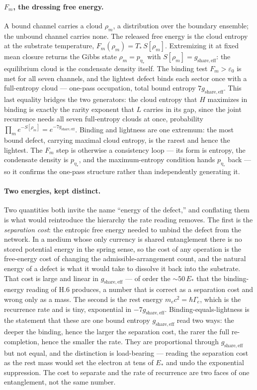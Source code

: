 \documentclass[11pt]{article}
\begin{document}
\paragraph{$F_m$, the dressing free energy.}
A bound channel carries a cloud $\rho_m$, a distribution over the boundary ensemble; the unbound channel carries none. The released free energy is the cloud entropy at the substrate temperature, $F_m(\rho_m)=T_*\,S[\rho_m]$. Extremizing it at fixed mean closure returns the Gibbs state $\rho_m=p_{\eta_*}$ with $S[\rho_m]=g_{\mathrm{share,eff}}$: the equilibrium cloud is the condensate density itself. The binding test $F_m>\varepsilon_0$ is met for all seven channels, and the lightest defect binds each sector once with a full-entropy cloud --- one-pass occupation, total bound entropy $7g_{\mathrm{share,eff}}$. This last equality bridges the two generators: the cloud entropy that $H$ maximizes in binding is exactly the rarity exponent that $L$ carries in its gap, since the joint recurrence needs all seven full-entropy clouds at once, probability $\prod_m e^{-S[\rho_m]}=e^{-7g_{\mathrm{share,eff}}}$. Binding and lightness are one extremum: the most bound defect, carrying maximal cloud entropy, is the rarest and hence the lightest. The $F_m$ step is otherwise a consistency loop --- its form is entropy, the condensate density is $p_{\eta_*}$, and the maximum-entropy condition hands $p_{\eta_*}$ back --- so it confirms the one-pass structure rather than independently generating it.

\paragraph{Two energies, kept distinct.}
Two quantities both invite the name ``energy of the defect,'' and conflating them is what would reintroduce the hierarchy the rate reading removes. The first is the \emph{separation cost}: the entropic free energy needed to unbind the defect from the network. In a medium whose only currency is shared entanglement there is no stored potential energy in the spring sense, so the cost of any operation is the free-energy cost of changing the admissible-arrangement count, and the natural energy of a defect is what it would take to dissolve it back into the substrate. That cost is large and linear in $g_{\mathrm{share,eff}}$ --- of order the $\sim50\,E_*$ that the binding-energy reading of H.6 produces, a number that is correct as a separation cost and wrong only as a mass. The second is the rest energy $m_ec^2=\hbar\Gamma_e$, which is the recurrence rate and is tiny, exponential in $-7g_{\mathrm{share,eff}}$. Binding-equals-lightness is the statement that these are one bound entropy $g_{\mathrm{share,eff}}$ read two ways: the deeper the binding, hence the larger the separation cost, the rarer the full re-completion, hence the smaller the rate. They are proportional through $g_{\mathrm{share,eff}}$ but not equal, and the distinction is load-bearing --- reading the separation cost as the rest mass would set the electron at tens of $E_*$ and undo the exponential suppression. The cost to separate and the rate of recurrence are two faces of one entanglement, not the same number.
\end{document}
